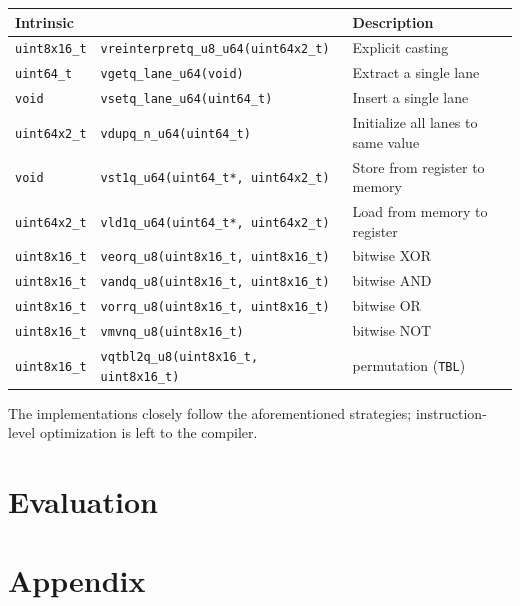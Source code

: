 \documentclass[12pt]{report}
\begin{document}
\begin{table}[h!]
    \centering
    \footnotesize
    \begin{tabularx}{\textwidth}{ll|X}
        Intrinsic && Description \\
        \hline
        \texttt{uint8x16\_t} & \texttt{vreinterpretq\_u8\_u64(uint64x2\_t)} & Explicit casting \\
        \hline
        \texttt{uint64\_t} & \texttt{vgetq\_lane\_u64(void)} & Extract a single lane \\
        \hline
        \texttt{void} & \texttt{vsetq\_lane\_u64(uint64\_t)} & Insert a single lane \\
        \hline
        \texttt{uint64x2\_t} & \texttt{vdupq\_n\_u64(uint64\_t)} & Initialize all lanes to same value \\
        \hline
        \texttt{void} & \texttt{vst1q\_u64(uint64\_t*, uint64x2\_t)} & Store from register to memory \\
        \hline
        \texttt{uint64x2\_t} & \texttt{vld1q\_u64(uint64\_t*, uint64x2\_t)} & Load from memory to register \\
        \hline
        \texttt{uint8x16\_t} & \texttt{veorq\_u8(uint8x16\_t, uint8x16\_t)} & bitwise XOR \\
        \hline
        \texttt{uint8x16\_t} & \texttt{vandq\_u8(uint8x16\_t, uint8x16\_t)} & bitwise AND \\
        \hline
        \texttt{uint8x16\_t} & \texttt{vorrq\_u8(uint8x16\_t, uint8x16\_t)} & bitwise OR \\
        \hline
        \texttt{uint8x16\_t} & \texttt{vmvnq\_u8(uint8x16\_t)} & bitwise NOT \\
        \hline
        \texttt{uint8x16\_t} & \texttt{vqtbl2q\_u8(uint8x16\_t, uint8x16\_t)} & permutation (\texttt{TBL}) \\
    \end{tabularx}
\end{table}

The implementations closely follow the aforementioned strategies;
instruction-level optimization is left to the compiler.

\chapter{Evaluation}

\chapter{Appendix}
\end{document}
